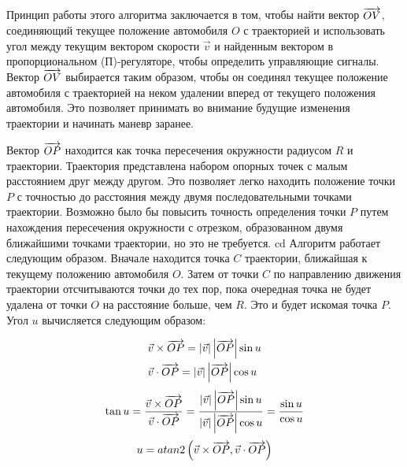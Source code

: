 Принцип работы этого алгоритма заключается в том, чтобы найти вектор $\overrightarrow{OV}$, соединяющий текущее положение
автомобиля $O$ с траекторией и использовать угол между текущим вектором скорости $\vec{v}$ и найденным вектором в
пропорциональном (П)-регуляторе, чтобы определить управляющие сигналы. Вектор $\overrightarrow{OV}$ выбирается таким образом,
чтобы он соединял текущее положение автомобиля с траекторией на неком удалении вперед от текущего положения автомобиля.
Это позволяет принимать во внимание будущие изменения траектории и начинать маневр заранее.

Вектор $\overrightarrow{OP}$ находится как точка пересечения окружности радиусом $R$ и траектории. Траектория представлена набором
опорных точек с малым расстоянием друг между другом. Это позволяет легко находить положение точки $P$ с точностью до
расстояния между двумя последовательными точками траектории. Возможно было бы повысить точность определения точки $P$
путем нахождения пересечения окружности с отрезком, образованном двумя ближайшими точками траектории, но это не
требуется.
cd
Алгоритм работает следующим образом. Вначале находится точка $C$ траектории, ближайшая к текущему положению автомобиля
$O$. Затем от точки $C$ по направлению движения траектории отсчитываются точки до тех пор, пока очередная точка не будет
удалена от точки $O$ на расстояние больше, чем $R$. Это и будет искомая точка $P$. Угол $u$ вычисляется следующим
образом:

\begin{align}
    &\vec{v}\times\overrightarrow{OP} = \left|\vec{v}\right|\left|\overrightarrow{OP}\right|\sin u \\
    &\vec{v}\cdot \overrightarrow{OP} = \left|\vec{v}\right|\left|\overrightarrow{OP}\right|\cos u \\
\end{align}
\begin{equation}
    \tan u  = \frac{\vec{v}\times\overrightarrow{OP}}{\vec{v}\cdot \overrightarrow{OP}} =
              \frac{\left|\vec{v}\right|\left|\overrightarrow{OP}\right|\sin u}
                   {\left|\vec{v}\right|\left|\overrightarrow{OP}\right|\cos u} =
              \frac{\sin u}{\cos u} \\
\end{equation}
\begin{equation}
    u = atan2 \left(\vec{v}\times\overrightarrow{OP}, \vec{v}\cdot\overrightarrow{OP}\right)
\end{equation}


